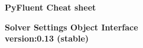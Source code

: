\documentclass[9pt,landscape]{article}
\begin{document}
\raggedright
\footnotesize

\begin{center}
     \Huge{\textbf{PyFluent Cheat sheet}} \\
\end{center}
\begin{center}
     \Large{\textbf{Solver Settings Object Interface}} \\
     \small{\textbf{version:0.13 (stable)}} \\
\end{center}

\vspace{-0.15cm}
\noindent\makebox[\linewidth]{\rule{\paperwidth}{2pt}}
\end{document}
